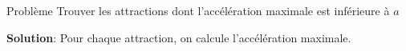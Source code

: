 \begin{frame}
    \frametitle{\problemtitle}
        \begin{block}
            {Problème} Trouver les attractions dont l'accélération maximale est inférieure à $a$
        \end{block}
        \pause
        \textbf{Solution}: Pour chaque attraction, on calcule l'accélération maximale.
\end{frame}


